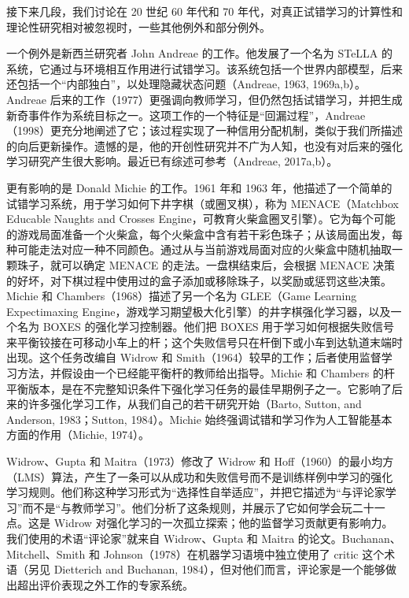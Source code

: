 \documentclass[UTF8, 12pt, fontset=fandol, oneside]{ctexart}
\begin{document}
接下来几段，我们讨论在 20 世纪 60 年代和 70 年代，对真正试错学习的计算性和理论性研究相对被忽视时，一些其他例外和部分例外。

一个例外是新西兰研究者 John Andreae 的工作。他发展了一个名为 STeLLA 的系统，它通过与环境相互作用进行试错学习。该系统包括一个世界内部模型，后来还包括一个“内部独白”，以处理隐藏状态问题（Andreae, 1963, 1969a,b）。Andreae 后来的工作（1977）更强调向教师学习，但仍然包括试错学习，并把生成新奇事件作为系统目标之一。这项工作的一个特征是“回漏过程”，Andreae（1998）更充分地阐述了它；该过程实现了一种信用分配机制，类似于我们所描述的向后更新操作。遗憾的是，他的开创性研究并不广为人知，也没有对后来的强化学习研究产生很大影响。最近已有综述可参考（Andreae, 2017a,b）。

更有影响的是 Donald Michie 的工作。1961 年和 1963 年，他描述了一个简单的试错学习系统，用于学习如何下井字棋（或圈叉棋），称为 MENACE（Matchbox Educable Naughts and Crosses Engine，可教育火柴盒圈叉引擎）。它为每个可能的游戏局面准备一个火柴盒，每个火柴盒中含有若干彩色珠子；从该局面出发，每种可能走法对应一种不同颜色。通过从与当前游戏局面对应的火柴盒中随机抽取一颗珠子，就可以确定 MENACE 的走法。一盘棋结束后，会根据 MENACE 决策的好坏，对下棋过程中使用过的盒子添加或移除珠子，以奖励或惩罚这些决策。Michie 和 Chambers（1968）描述了另一个名为 GLEE（Game Learning Expectimaxing Engine，游戏学习期望极大化引擎）的井字棋强化学习器，以及一个名为 BOXES 的强化学习控制器。他们把 BOXES 用于学习如何根据失败信号来平衡铰接在可移动小车上的杆；这个失败信号只在杆倒下或小车到达轨道末端时出现。这个任务改编自 Widrow 和 Smith（1964）较早的工作；后者使用监督学习方法，并假设由一个已经能平衡杆的教师给出指导。Michie 和 Chambers 的杆平衡版本，是在不完整知识条件下强化学习任务的最佳早期例子之一。它影响了后来的许多强化学习工作，从我们自己的若干研究开始（Barto, Sutton, and Anderson, 1983；Sutton, 1984）。Michie 始终强调试错和学习作为人工智能基本方面的作用（Michie, 1974）。

Widrow、Gupta 和 Maitra（1973）修改了 Widrow 和 Hoff（1960）的最小均方（LMS）算法，产生了一条可以从成功和失败信号而不是训练样例中学习的强化学习规则。他们称这种学习形式为“选择性自举适应”，并把它描述为“与评论家学习”而不是“与教师学习”。他们分析了这条规则，并展示了它如何学会玩二十一点。这是 Widrow 对强化学习的一次孤立探索；他的监督学习贡献更有影响力。我们使用的术语“评论家”就来自 Widrow、Gupta 和 Maitra 的论文。Buchanan、Mitchell、Smith 和 Johnson（1978）在机器学习语境中独立使用了 critic 这个术语（另见 Dietterich and Buchanan, 1984），但对他们而言，评论家是一个能够做出超出评价表现之外工作的专家系统。
\end{document}
